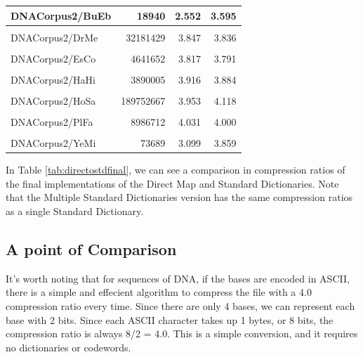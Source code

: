\documentclass[12pt,twoside]{reedthesis}
\begin{document}
\begin{table}[!h]
{\begin{tabular}[t]{l|r|r|r}
\hline
DNACorpus2/BuEb & 18940 & 2.552 & 3.595\\
\hline
\cellcolor{gray!6}{DNACorpus2/DaRe} & \cellcolor{gray!6}{62565020} & \cellcolor{gray!6}{3.928} & \cellcolor{gray!6}{4.013}\\
\hline
DNACorpus2/DrMe & 32181429 & 3.847 & 3.836\\
\hline
\cellcolor{gray!6}{DNACorpus2/EnIn} & \cellcolor{gray!6}{26403087} & \cellcolor{gray!6}{3.918} & \cellcolor{gray!6}{3.893}\\
\hline
DNACorpus2/EsCo & 4641652 & 3.817 & 3.791\\
\hline
\cellcolor{gray!6}{DNACorpus2/GaGa} & \cellcolor{gray!6}{148532294} & \cellcolor{gray!6}{3.776} & \cellcolor{gray!6}{3.943}\\
\hline
DNACorpus2/HaHi & 3890005 & 3.916 & 3.884\\
\hline
\cellcolor{gray!6}{DNACorpus2/HePy} & \cellcolor{gray!6}{1667825} & \cellcolor{gray!6}{3.884} & \cellcolor{gray!6}{3.894}\\
\hline
DNACorpus2/HoSa & 189752667 & 3.953 & 4.118\\
\hline
\cellcolor{gray!6}{DNACorpus2/OrSa} & \cellcolor{gray!6}{43262523} & \cellcolor{gray!6}{3.843} & \cellcolor{gray!6}{3.858}\\
\hline
DNACorpus2/PlFa & 8986712 & 4.031 & 4.000\\
\hline
\cellcolor{gray!6}{DNACorpus2/ScPo} & \cellcolor{gray!6}{10652155} & \cellcolor{gray!6}{3.847} & \cellcolor{gray!6}{3.813}\\
\hline
DNACorpus2/YeMi & 73689 & 3.099 & 3.859\\
\hline
\end{tabular}}
\end{table}
In Table \ref{tab:directostdfinal}, we can see a comparison in compression ratios of the final implementations of the Direct Map and Standard Dictionaries. Note that the Multiple Standard Dictionaries version has the same compression ratios as a single Standard Dictionary.

\hypertarget{a-point-of-comparison}{%
\subsection{A point of Comparison}\label{a-point-of-comparison}}

It's worth noting that for sequences of DNA, if the bases are encoded in ASCII, there is a simple and effecient algorithm to compress the file with a 4.0 compression ratio every time. Since there are only 4 bases, we can represent each base with 2 bits. Since each ASCII character takes up 1 bytes, or 8 bits, the compression ratio is always 8/2 = 4.0. This is a simple conversion, and it requires no dictionaries or codewords.
\end{document}
